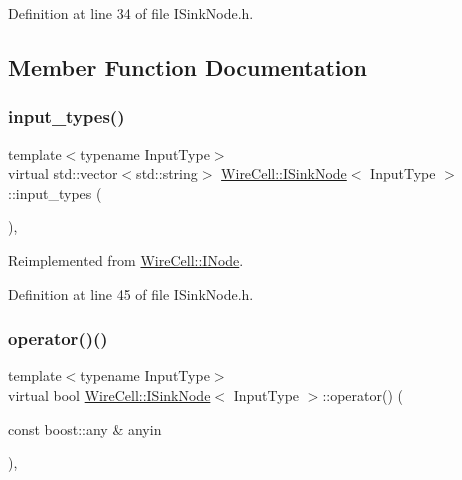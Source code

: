 Definition at line 34 of file I\+Sink\+Node.\+h.



\subsection{Member Function Documentation}
\mbox{\label{class_wire_cell_1_1_i_sink_node_abe62e5f37a46c15bd6481fb75c86ec85}} 
\subsubsection{\texorpdfstring{input\+\_\+types()}{input\_types()}}
{\footnotesize\ttfamily template$<$typename Input\+Type$>$ \\
virtual std\+::vector$<$std\+::string$>$ \hyperlink{class_wire_cell_1_1_i_sink_node}{Wire\+Cell\+::\+I\+Sink\+Node}$<$ Input\+Type $>$\+::input\+\_\+types (\begin{DoxyParamCaption}{ }\end{DoxyParamCaption})\hspace{0.3cm}{\ttfamily [inline]}, {\ttfamily [virtual]}}



Reimplemented from \hyperlink{class_wire_cell_1_1_i_node_ae13fc140c8e815fac9327dfa5b43f853}{Wire\+Cell\+::\+I\+Node}.



Definition at line 45 of file I\+Sink\+Node.\+h.

\mbox{\label{class_wire_cell_1_1_i_sink_node_a793d39beb4d1ab8c3f4639ce1aa337d9}} 
\subsubsection{\texorpdfstring{operator()()}{operator()()}\hspace{0.1cm}{\footnotesize\ttfamily [1/2]}}
{\footnotesize\ttfamily template$<$typename Input\+Type$>$ \\
virtual bool \hyperlink{class_wire_cell_1_1_i_sink_node}{Wire\+Cell\+::\+I\+Sink\+Node}$<$ Input\+Type $>$\+::operator() (\begin{DoxyParamCaption}\item[{const boost\+::any \&}]{anyin }\end{DoxyParamCaption})\hspace{0.3cm}{\ttfamily [inline]}, {\ttfamily [virtual]}}



